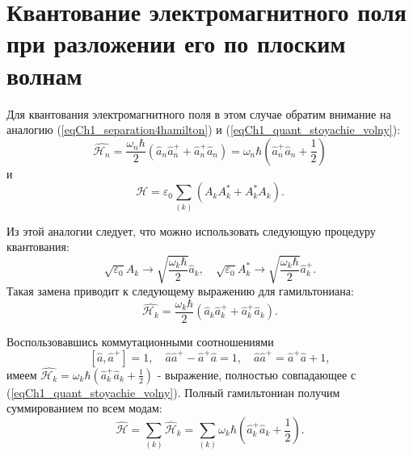 \section{Квантование электромагнитного поля при разложении его по
  плоским волнам}
Для квантования электромагнитного поля в этом случае обратим внимание
на аналогию (\ref{eqCh1_separation4hamilton}) и
(\ref{eqCh1_quant_stoyachie_volny}):
\[
\hat{\mathcal{H}_n} = 
\frac{\omega_n \hbar}{2}
\left(\hat{a}_n \hat{a}_n^{+} + \hat{a}_n^{+} \hat{a}_n\right)
=
\omega_n \hbar 
\left(\hat{a}_n^{+} \hat{a}_n + \frac{1}{2}\right)
\]
и
\[
\mathcal{H} = \varepsilon_0 \sum_{(k)} 
\left(A_k A_k^{*} + A_k^{*} A_k \right).
\]

Из этой аналогии следует, что можно использовать следующую процедуру
квантования:
\[
\sqrt{\varepsilon_0}A_k \rightarrow \sqrt{\frac{\omega_k \hbar}{2}}
\hat{a}_k, \quad
\sqrt{\varepsilon_0}A_k^{*} \rightarrow \sqrt{\frac{\omega_k \hbar}{2}}
\hat{a}_k^{+}.
\]
Такая замена приводит к следующему выражению для гамильтониана:
\[
\hat{\mathcal{H}_k} = \frac{\omega_k \hbar}{2} 
\left(\hat{a}_k \hat{a}_k^{+} + \hat{a}_k^{+} \hat{a}_k\right).
\]

Воспользовавшись коммутационными соотношениями
\[
\left[\hat{a}, \hat{a}^{+} \right] = 1, \quad
\hat{a} \hat{a}^{+} - \hat{a}^{+}\hat{a} = 1, \quad
\hat{a} \hat{a}^{+} = \hat{a}^{+}\hat{a} + 1,
\]
имеем
\(
\hat{\mathcal{H}_k} = \omega_k \hbar 
\left(\hat{a}_k^{+} \hat{a}_k + \frac{1}{2}\right)
\) - 
выражение, полностью совпадающее с (\ref{eqCh1_quant_stoyachie_volny}).
Полный гамильтониан получим суммированием по всем модам:
\begin{equation}
\hat{\mathcal{H}} = \sum_{(k)} \hat{\mathcal{H}}_k = \sum_{(k)} 
\omega_k \hbar \left(\hat{a}_k^{+} \hat{a}_k + \frac{1}{2}\right).
\end{equation}

